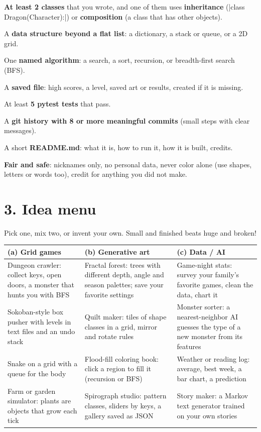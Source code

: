 \documentclass[level=3]{kidscode}
\begin{document}
\begin{selfcheck}
  \item \textbf{At least 2 classes} that you wrote, and one of them uses \textbf{inheritance}
        (\py|class Dragon(Character):|) or \textbf{composition} (a class that has other objects).
  \item A \textbf{data structure beyond a flat list}: a dictionary, a stack or queue, or a 2D grid.
  \item One \textbf{named algorithm}: a search, a sort, recursion, or breadth-first search (BFS).
  \item A \textbf{saved file}: high scores, a level, saved art or results, created if it is missing.
  \item At least \textbf{5 pytest tests} that pass.
  \item A \textbf{git history with 8 or more meaningful commits} (small steps with clear messages).
  \item A short \textbf{README.md}: what it is, how to run it, how it is built, credits.
  \item \textbf{Fair and safe}: nicknames only, no personal data, never color alone (use shapes,
        letters or words too), credit for anything you did not make.
\end{selfcheck}

\section{3. Idea menu}
Pick one, mix two, or invent your own. Small and finished beats huge and broken!

\begin{longtable}{@{}>{\raggedright\arraybackslash}p{}>{\raggedright\arraybackslash}p{}>{\raggedright\arraybackslash}p{}@{}}
\toprule
\rowcolor{kcaccent!15}\textbf{(a) Grid games} & \textbf{(b) Generative art} & \textbf{(c) Data / AI}\\ \midrule\endhead
\bottomrule\endfoot
Dungeon crawler: collect keys, open doors, a monster that hunts you with BFS &
Fractal forest: trees with different depth, angle and season palettes; save your favorite settings &
Game-night stats: survey your family's favorite games, clean the data, chart it\\ \midrule
Sokoban-style box pusher with levels in text files and an undo stack &
Quilt maker: tiles of shape classes in a grid, mirror and rotate rules &
Monster sorter: a nearest-neighbor AI guesses the type of a new monster from its features\\ \midrule
Snake on a grid with a queue for the body &
Flood-fill coloring book: click a region to fill it (recursion or BFS) &
Weather or reading log: average, best week, a bar chart, a prediction\\ \midrule
Farm or garden simulator: plants are objects that grow each tick &
Spirograph studio: pattern classes, sliders by keys, a gallery saved as JSON &
Story maker: a Markov text generator trained on your own stories\\
\end{longtable}
\end{document}
